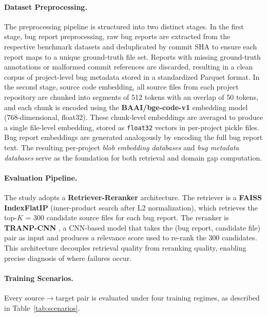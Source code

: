 \documentclass[12pt,table,xcdraw]{article}
\begin{document}
\paragraph{Dataset Preprocessing.}
The preprocessing pipeline is structured into two distinct stages. In the first stage, bug report preprocessing, raw bug reports are extracted from the respective benchmark datasets and deduplicated by commit SHA to ensure each report maps to a unique ground-truth file set. Reports with missing ground-truth annotations or malformed commit references are discarded, resulting in a clean corpus of project-level bug metadata stored in a standardized Parquet format. In the second stage, source code embedding, all source files from each project repository are chunked into segments of 512 tokens with an overlap of 50 tokens, and each chunk is encoded using the \textbf{BAAI/bge-code-v1} \cite{bge_embedding} embedding model (768-dimensional, float32). These chunk-level embeddings are averaged to produce a single file-level embedding, stored as \texttt{float32} vectors in per-project pickle files. Bug report embeddings are generated analogously by encoding the full bug report text. The resulting per-project \textit{blob embedding databases} and \textit{bug metadata databases} serve as the foundation for both retrieval and domain gap computation.

\paragraph{Evaluation Pipeline.}
The study adopts a \textbf{Retriever-Reranker} architecture. The retriever is a \textbf{FAISS IndexFlatIP} (inner-product search after L2 normalization), which retrieves the top-$K$ = 300 candidate source files for each bug report. The reranker is \textbf{TRANP-CNN} \cite{huo2019deep}, a CNN-based model that takes the (bug report, candidate file) pair as input and produces a relevance score used to re-rank the 300 candidates. This architecture decouples retrieval quality from reranking quality, enabling precise diagnosis of where failures occur.

\paragraph{Training Scenarios.}
Every source$\rightarrow$target pair is evaluated under four training regimes, as described in Table~\ref{tab:scenarios}.
\end{document}
